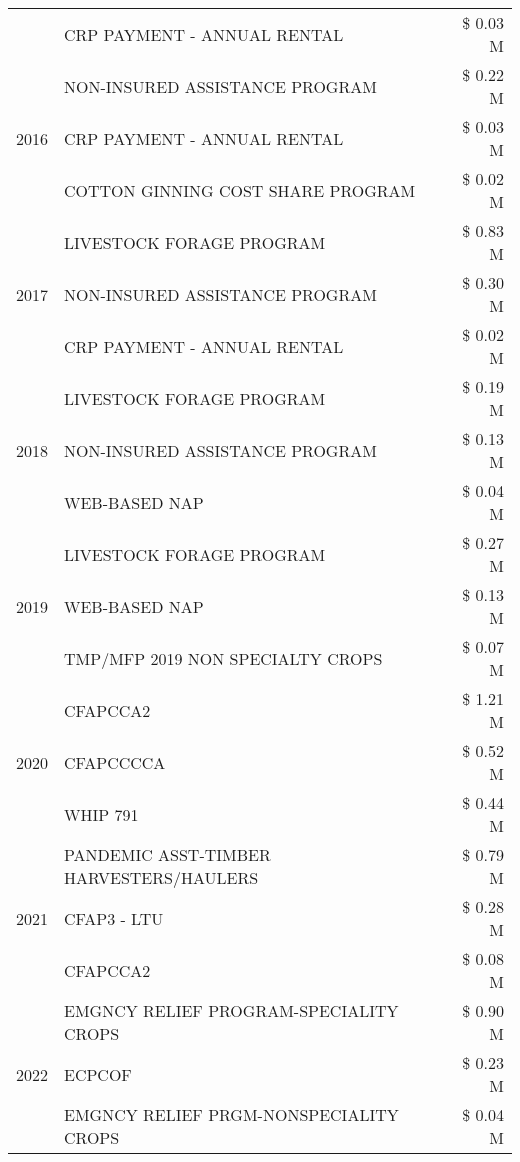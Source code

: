 \begin{tabular}{llr}
 & CRP PAYMENT - ANNUAL RENTAL & \$ 0.03 M \\
\cline{1-3}
\multirow[t]{3}{*}{2016} & NON-INSURED ASSISTANCE PROGRAM & \$ 0.22 M \\
 & CRP PAYMENT - ANNUAL RENTAL & \$ 0.03 M \\
 & COTTON GINNING COST SHARE PROGRAM & \$ 0.02 M \\
\cline{1-3}
\multirow[t]{3}{*}{2017} & LIVESTOCK FORAGE PROGRAM & \$ 0.83 M \\
 & NON-INSURED ASSISTANCE PROGRAM & \$ 0.30 M \\
 & CRP PAYMENT - ANNUAL RENTAL & \$ 0.02 M \\
\cline{1-3}
\multirow[t]{3}{*}{2018} & LIVESTOCK FORAGE PROGRAM & \$ 0.19 M \\
 & NON-INSURED ASSISTANCE PROGRAM & \$ 0.13 M \\
 & WEB-BASED NAP & \$ 0.04 M \\
\cline{1-3}
\multirow[t]{3}{*}{2019} & LIVESTOCK FORAGE PROGRAM & \$ 0.27 M \\
 & WEB-BASED NAP & \$ 0.13 M \\
 & TMP/MFP 2019 NON SPECIALTY CROPS & \$ 0.07 M \\
\cline{1-3}
\multirow[t]{3}{*}{2020} & CFAPCCA2 & \$ 1.21 M \\
 & CFAPCCCCA & \$ 0.52 M \\
 & WHIP 791 & \$ 0.44 M \\
\cline{1-3}
\multirow[t]{3}{*}{2021} & PANDEMIC ASST-TIMBER HARVESTERS/HAULERS & \$ 0.79 M \\
 & CFAP3 - LTU & \$ 0.28 M \\
 & CFAPCCA2 & \$ 0.08 M \\
\cline{1-3}
\multirow[t]{3}{*}{2022} & EMGNCY RELIEF PROGRAM-SPECIALITY CROPS & \$ 0.90 M \\
 & ECPCOF & \$ 0.23 M \\
 & EMGNCY RELIEF PRGM-NONSPECIALITY CROPS & \$ 0.04 M \\
\cline{1-3}
\bottomrule
\end{tabular}
